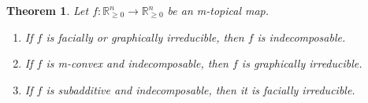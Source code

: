 \documentclass[10pt,reqno]{amsart}
\newcommand{\R}{\mathbb{R}}
\theoremstyle{plain}
\newtheorem{theorem}{Theorem}[section]
\theoremstyle{definition}
\numberwithin{equation}{section}
\begin{document}
\begin{theorem} \label{thm:connect1}
Let $f:\R^n_{\ge 0} \rightarrow \R^n_{\ge 0}$ be an m-topical map.  
\begin{enumerate}
\item \label{item:face=>indecomp} If $f$ is facially or graphically irreducible, then $f$ is indecomposable. 
\item \label{item:mconvex1} If $f$ is m-convex and indecomposable, then $f$ is graphically irreducible.  
\item \label{item:subadditive} If $f$ is subadditive and indecomposable, then it is facially irreducible. %
\end{enumerate}
\end{theorem}
\end{document}
